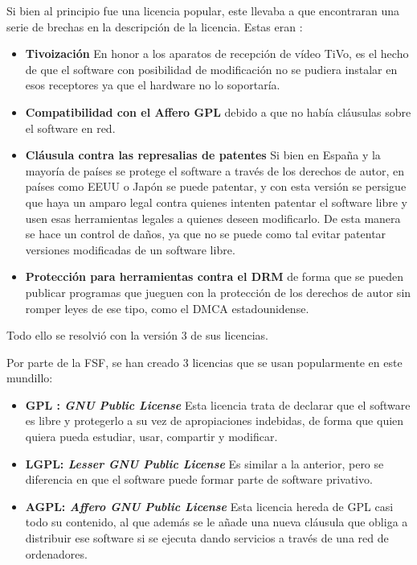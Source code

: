 Si bien al principio fue una licencia popular, este llevaba a que encontraran una serie de brechas en la descripción de la licencia. Estas eran \cite{gplv3-changelog}:
\begin{itemize}
	\item \textbf{Tivoización} En honor a los aparatos de recepción de vídeo TiVo, es el hecho de que el software con posibilidad de modificación no se pudiera instalar en esos receptores ya que el hardware no lo soportaría.
	
	\item \textbf{Compatibilidad con el Affero GPL} debido a que no había cláusulas sobre el software en red.
	
	\item \textbf{Cláusula contra las represalias de patentes} Si bien en España y la mayoría de países se protege el software a través de los derechos de autor, en países como EEUU o Japón se puede patentar, y con esta versión se persigue que haya un amparo legal contra quienes intenten patentar el software libre y usen esas herramientas legales a quienes deseen modificarlo. De esta manera se hace un control de daños, ya que no se puede como tal evitar patentar versiones modificadas de un software libre.
	
	\item \textbf{Protección para herramientas contra el DRM} de forma que se pueden publicar programas que jueguen con la protección de los derechos de autor sin romper leyes de ese tipo, como el DMCA estadounidense.
	
\end{itemize} 

Todo ello se resolvió con la versión 3 de sus licencias. \cite{gplv3-changelog}

Por parte de la FSF, se han creado 3 licencias que se usan popularmente en este mundillo:

\label{gpl-license-types}
\begin{itemize}
	\item \textbf{GPL : \textit{GNU Public License}} Esta licencia trata de declarar que el software es libre y protegerlo a su vez de apropiaciones indebidas, de forma que quien quiera pueda estudiar, usar, compartir y modificar. 
	\item \textbf{LGPL: \textit{Lesser GNU Public License}} Es similar a la anterior, pero se diferencia en que el software puede formar parte de software privativo.
	\item \textbf{AGPL: \textit{Affero GNU Public License}} Esta licencia hereda de GPL casi todo su contenido, al que además se le añade una nueva cláusula que obliga a distribuir ese software si se ejecuta dando servicios a través de una red de ordenadores.
\end{itemize}

